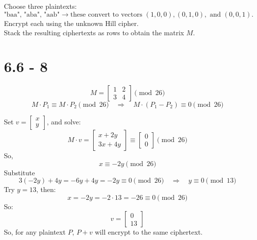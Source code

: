 \documentclass[12pt]{article}
\begin{document}
Choose three plaintexts:
\[
\text{"baa", "aba", "aab"} \rightarrow \text{these convert to vectors } (1,0,0), (0,1,0), \text{ and } (0,0,1).
\]
Encrypt each using the unknown Hill cipher. \\
Stack the resulting ciphertexts as rows to obtain the matrix \( M \).





\newpage

\section*{6.6 - 8}



\[
M = \begin{bmatrix}
1 & 2 \\
3 & 4
\end{bmatrix} \pmod{26}
\]
\[
M \cdot P_1 \equiv M \cdot P_2 \pmod{26} \quad \Rightarrow \quad M \cdot (P_1 - P_2) \equiv 0 \pmod{26}
\]

Set \( v = \begin{bmatrix} x \\ y \end{bmatrix} \), and solve:
\[
M \cdot v = \begin{bmatrix}
x + 2y \\
3x + 4y
\end{bmatrix}
\equiv
\begin{bmatrix}
0 \\
0
\end{bmatrix}
\pmod{26}
\]
So,
\[
x \equiv -2y \pmod{26}
\]
Substitute
\[
3(-2y) + 4y = -6y + 4y = -2y \equiv 0 \pmod{26} \quad \Rightarrow \quad y \equiv 0 \pmod{13}
\]
Try \( y = 13 \), then:
\[
x = -2y = -2 \cdot 13 = -26 \equiv 0 \pmod{26}
\]
So:
\[
v = \begin{bmatrix}
0 \\
13
\end{bmatrix}
\]
So, for any plaintext \( P \), \( P + v \) will encrypt to the same ciphertext.
\end{document}
